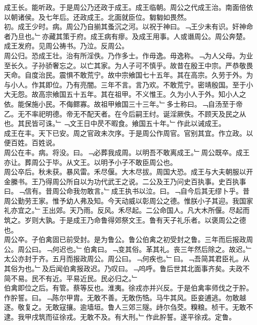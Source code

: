 \documentclass{zhvt-classic}
\begin{document}
\hspace*{2em}成王长。能听政。于是周公乃还政于成王。成王临朝。周公之代成王治。南面倍依以朝诸侯。及七年后。还政成王。北面就臣位。匔匔如畏然。\\
\hspace*{2em}初。成王少时。病。周公乃自揃其蚤沉之河。以祝于神曰。﹁王少未有识。奸神命者乃旦也。﹂亦藏其策于府。成王病有瘳。及成王用事。人或谮周公。周公奔楚。成王发府。见周公祷书。乃泣。反周公。\\
\hspace*{2em}周公归。恐成王壮。治有所淫佚。乃作多士。作毋逸。毋逸称。﹁为人父母。为业至长久。子孙骄奢忘之。以亡其家。为人子可不慎乎。故昔在殷王中宗。严恭敬畏天命。自度治民。震惧不敢荒宁。故中宗飨国七十五年。其在高宗。久劳于外。为与小人。作其即位。乃有亮闇。三年不言。言乃欢。不敢荒宁。密靖殷国。至于小大无怨。故高宗飨国五十五年。其在祖甲。不义惟王。久为小人于外。知小人之依。能保施小民。不侮鳏寡。故祖甲飨国三十三年。﹂多士称曰。﹁自汤至于帝乙。无不率祀明德。帝无不配天者。在今后嗣王纣。诞淫厥佚。不顾天及民之从也。其民皆可诛。﹂﹁文王日中昃不暇食。飨国五十年。﹂作此以诫成王。\\
\hspace*{2em}成王在丰。天下已安。周之官政未次序。于是周公作周官。官别其宜。作立政。以便百姓。百姓说。\\
\hspace*{2em}周公在丰。病。将没。曰。﹁必葬我成周。以明吾不敢离成王。﹂周公既卒。成王亦让。葬周公于毕。从文王。以明予小子不敢臣周公也。\\
\hspace*{2em}周公卒后。秋未获。暴风雷。禾尽偃。大木尽拔。周国大恐。成王与大夫朝服以开金縢书。王乃得周公所自以为功代武王之说。二公及王乃问史百执事。史百执事曰。﹁信有。昔周公命我勿敢言。﹂成王执书以泣。曰。﹁自今后其无缪卜乎。昔周公勤劳王家。惟予幼人弗及知。今天动威以彰周公之德。惟朕小子其迎。我国家礼亦宜之。﹂王出郊。天乃雨。反风。禾尽起。二公命国人。凡大木所偃。尽起而筑之。岁则大孰。于是成王乃命鲁得郊祭文王。鲁有天子礼乐者。以褒周公之德也。\\
\hspace*{2em}周公卒。子伯禽固已前受封。是为鲁公。鲁公伯禽之初受封之鲁。三年而后报政周公。周公曰。﹁何迟也。﹂伯禽曰。﹁变其俗。革其礼。丧三年然后除之。故迟。﹂太公亦封于齐。五月而报政周公。周公曰。﹁何疾也。﹂曰。﹁吾简其君臣礼。从其俗为也。﹂及后闻伯禽报政迟。乃叹曰。﹁呜呼。鲁后世其北面事齐矣。夫政不简不易。民不有近。平易近民。民必归之。﹂\\
\hspace*{2em}伯禽即位之后。有管。蔡等反也。淮夷。徐戎亦并兴反。于是伯禽率师伐之于肸。作肸誓。曰。﹁陈尔甲胄。无敢不善。无敢伤牿。马牛其风。臣妾逋逃。勿敢越逐。敬复之。无敢寇攘。逾墙垣。鲁人三郊三隧。歭尔刍茭。糗粮。桢干。无敢不逮。我甲戌筑而征徐戎。无敢不及。有大刑。﹂作此肸誓。遂平徐戎。定鲁。\\
\end{document}
